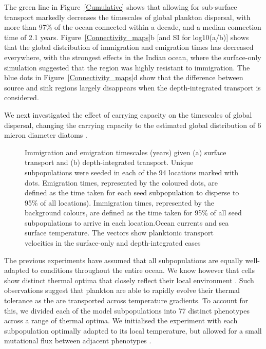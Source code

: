 \documentclass[12pt]{article}
\begin{document}
The green line in Figure~\ref{Cumulative} shows that allowing for sub-surface transport markedly decreases the timescales of global plankton dispersal, with more than 97\% of the ocean connected within a decade, and a median connection time of 2.1 years. Figure~\ref{Connectivity_maps}b [and SI for log10(a/b)] shows that the global distribution of immigration and emigration times has decreased everywhere, with the strongest effects in the Indian ocean, where the surface-only simulation suggested that the region was highly resistant to immigration. The blue dots in Figure~\ref{Connectivity_maps}d show that the difference between source and sink regions largely disappears when the depth-integrated transport is considered. 

We next investigated the effect of carrying capacity on the timescales of global dispersal, changing the carrying capacity to the estimated global distribution of 6 micron diameter diatoms \citep{ref}.

\begin{figure}[t!]
    \centering
    \caption{Immigration and emigration timescales (years) given (a) surface transport and (b) depth-integrated transport. Unique subpopulations were seeded in each of the 94 locations marked with dots. Emigration times, represented by the coloured dots, are defined as the time taken for each seed subpopulation to disperse to 95\% of all locations). Immigration times, represented by the background colours, are defined as the time taken for 95\% of all seed subpopulations to arrive in each location.Ocean currents and sea surface temperature. The vectors show planktonic transport velocities in the surface-only and depth-integrated cases}
\label{}
\end{figure}


The previous experiments have assumed that all subpopulations are equally well-adapted to conditions throughout the entire ocean. We know however that cells show distinct thermal optima that closely reflect their local environment \citep{Thomas:2012}. Such observations suggest that plankton are able to rapidly evolve their thermal tolerance as the are transported across temperature gradients. To account for this, we divided each of the model subpopulations into 77 distinct phenotypes across a range of thermal optima. We initialised the experiment with each subpopulation optimally adapted to its local temperature, but allowed for a small mutational flux between adjacent phenotypes \citep{Beckman:2019}.
\end{document}
